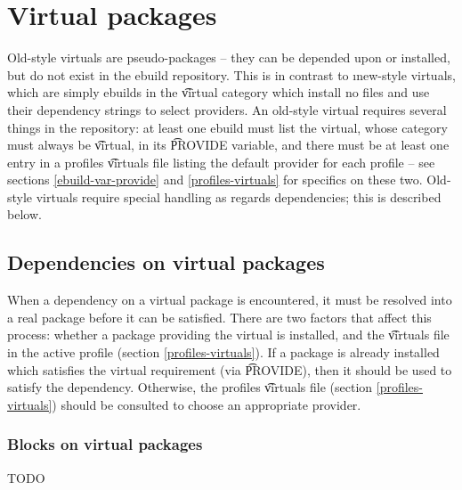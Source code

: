 \chapter{Virtual packages}
\label{old-virtuals}

Old-style virtuals are pseudo-packages -- they can be depended upon or installed, but do not exist
in the ebuild repository. This is in contrast to \i{new-style} virtuals, which are simply ebuilds in
the \t{virtual} category which install no files and use their dependency strings to select
providers. An old-style virtual requires several things in the repository: at least
one ebuild must list the virtual, whose category must always be \t{virtual}, in its \t{PROVIDE}
variable, and there must be at least one entry in a profiles \t{virtuals} file listing the default
provider for each profile -- see sections \ref{ebuild-var-provide} and \ref{profiles-virtuals} for
specifics on these two. Old-style virtuals require special handling as regards dependencies; this is
described below.

\section{Dependencies on virtual packages}

When a dependency on a virtual package is encountered, it must be resolved into a real package
before it can be satisfied. There are two factors that affect this process: whether a package
providing the virtual is installed, and the \t{virtuals} file in the active profile (section
\ref{profiles-virtuals}). If a package is already installed which satisfies the virtual requirement
(via \t{PROVIDE}), then it should be used to satisfy the dependency. Otherwise, the profiles
\t{virtuals} file (section \ref{profiles-virtuals}) should be consulted to choose an appropriate
provider.

\subsection{Blocks on virtual packages}

TODO


